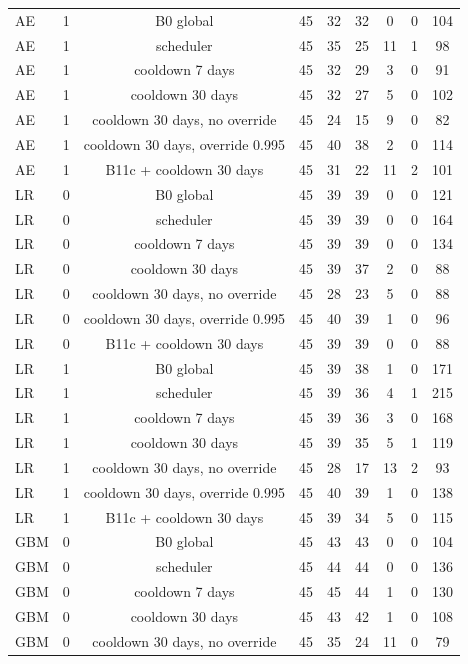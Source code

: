 \documentclass[10pt,onecolumn,letterpaper]{article}
\begin{document}
\begin{table}[!t]
{\begin{tabular}{lcccccccc}
AE & 1 & B0 global & 45 & 32 & 32 & 0 & 0 & 104 \\
AE & 1 & scheduler & 45 & 35 & 25 & 11 & 1 & 98 \\
AE & 1 & cooldown 7 days & 45 & 32 & 29 & 3 & 0 & 91 \\
AE & 1 & cooldown 30 days & 45 & 32 & 27 & 5 & 0 & 102 \\
AE & 1 & cooldown 30 days, no override & 45 & 24 & 15 & 9 & 0 & 82 \\
AE & 1 & cooldown 30 days, override 0.995 & 45 & 40 & 38 & 2 & 0 & 114 \\
AE & 1 & B11c + cooldown 30 days & 45 & 31 & 22 & 11 & 2 & 101 \\
LR & 0 & B0 global & 45 & 39 & 39 & 0 & 0 & 121 \\
LR & 0 & scheduler & 45 & 39 & 39 & 0 & 0 & 164 \\
LR & 0 & cooldown 7 days & 45 & 39 & 39 & 0 & 0 & 134 \\
LR & 0 & cooldown 30 days & 45 & 39 & 37 & 2 & 0 & 88 \\
LR & 0 & cooldown 30 days, no override & 45 & 28 & 23 & 5 & 0 & 88 \\
LR & 0 & cooldown 30 days, override 0.995 & 45 & 40 & 39 & 1 & 0 & 96 \\
LR & 0 & B11c + cooldown 30 days & 45 & 39 & 39 & 0 & 0 & 88 \\
LR & 1 & B0 global & 45 & 39 & 38 & 1 & 0 & 171 \\
LR & 1 & scheduler & 45 & 39 & 36 & 4 & 1 & 215 \\
LR & 1 & cooldown 7 days & 45 & 39 & 36 & 3 & 0 & 168 \\
LR & 1 & cooldown 30 days & 45 & 39 & 35 & 5 & 1 & 119 \\
LR & 1 & cooldown 30 days, no override & 45 & 28 & 17 & 13 & 2 & 93 \\
LR & 1 & cooldown 30 days, override 0.995 & 45 & 40 & 39 & 1 & 0 & 138 \\
LR & 1 & B11c + cooldown 30 days & 45 & 39 & 34 & 5 & 0 & 115 \\
GBM & 0 & B0 global & 45 & 43 & 43 & 0 & 0 & 104 \\
GBM & 0 & scheduler & 45 & 44 & 44 & 0 & 0 & 136 \\
GBM & 0 & cooldown 7 days & 45 & 45 & 44 & 1 & 0 & 130 \\
GBM & 0 & cooldown 30 days & 45 & 43 & 42 & 1 & 0 & 108 \\
GBM & 0 & cooldown 30 days, no override & 45 & 35 & 24 & 11 & 0 & 79 \\

\end{tabular}}
\end{table}
\end{document}
